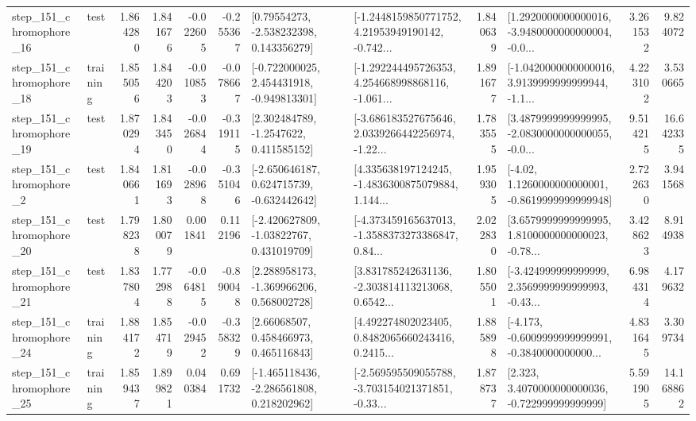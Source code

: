 \begin{tabular}{llrrrrllrlrr}
  step\_151\_chromophore\_16 &      test &      1.864280 &    1.841676 &     -0.022605 & -0.255367 &     [0.79554273, -2.538232398, 0.143356279] &  [-1.2448159850771752, 4.21953949190142, -0.742... &       1.840639 &  [1.2920000000000016, -3.9480000000000004, -0.0... &            3.261532 &          9.824072 \\
  step\_151\_chromophore\_18 &  training &      1.855056 &    1.844203 &     -0.010853 & -0.078667 &   [-0.722000025, 2.454431918, -0.949813301] &  [-1.292244495726353, 4.254668998868116, -1.061... &       1.891677 &  [-1.0420000000000016, 3.9139999999999944, -1.1... &            4.223102 &          3.530665 \\
  step\_151\_chromophore\_19 &      test &      1.870294 &    1.843450 &     -0.026844 & -0.319115 &      [2.302484789, -1.2547622, 0.411585152] &  [-3.686183527675646, 2.0339266442256974, -1.22... &       1.783555 &  [3.4879999999999995, -2.0830000000000055, -0.0... &            9.514215 &         16.642335 \\
   step\_151\_chromophore\_2 &      test &      1.840661 &    1.811693 &     -0.028968 & -0.351046 &   [-2.650646187, 0.624715739, -0.632442642] &  [4.335638197124245, -1.4836300875079884, 1.144... &       1.959305 &   [-4.02, 1.1260000000000001, -0.8619999999999948] &            2.722630 &          3.941568 \\
  step\_151\_chromophore\_20 &      test &      1.798238 &    1.800079 &      0.001841 &  0.112196 &    [-2.420627809, -1.03822767, 0.431019709] &  [-4.373459165637013, -1.3588373273386847, 0.84... &       2.022830 &  [3.6579999999999995, 1.8100000000000023, -0.78... &            3.428623 &          8.914938 \\
  step\_151\_chromophore\_21 &      test &      1.837804 &    1.772988 &     -0.064815 & -0.890048 &    [2.288958173, -1.369966206, 0.568002728] &  [3.831785242631136, -2.303814113213068, 0.6542... &       1.805501 &  [-3.424999999999999, 2.3569999999999993, -0.43... &            6.984314 &          4.179632 \\
  step\_151\_chromophore\_24 &  training &      1.884172 &    1.854719 &     -0.029452 & -0.358329 &      [2.66068507, 0.458466973, 0.465116843] &  [4.492274802023405, 0.8482065660243416, 0.2415... &       1.885898 &  [-4.173, -0.6009999999999991, -0.3840000000000... &            4.831645 &          3.309734 \\
  step\_151\_chromophore\_25 &  training &      1.859437 &    1.899821 &      0.040384 &  0.691732 &   [-1.465118436, -2.286561808, 0.218202962] &  [-2.569595509055788, -3.703154021371851, -0.33... &       1.878737 &    [2.323, 3.4070000000000036, -0.722999999999999] &            5.591905 &         14.168862 \\

\end{tabular}
